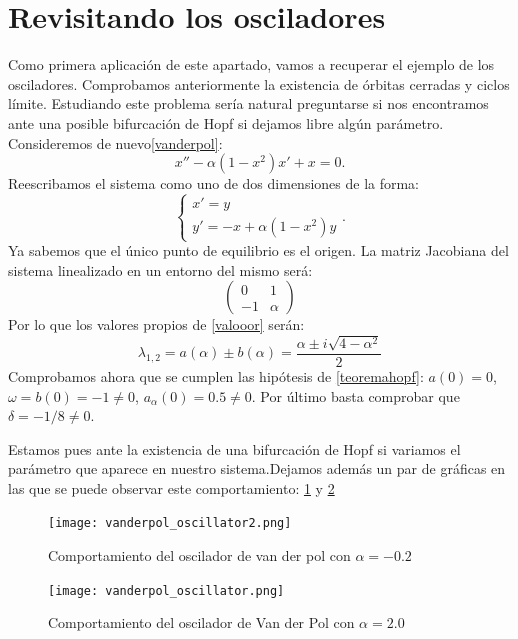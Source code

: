 \section{Revisitando los osciladores}
Como primera aplicación de este apartado, vamos a recuperar el ejemplo de los osciladores. Comprobamos anteriormente la existencia de órbitas cerradas y ciclos límite. Estudiando este problema sería natural preguntarse si nos encontramos ante una posible bifurcación de Hopf si dejamos libre algún parámetro.
Consideremos de nuevo\ref{vanderpol}:
\begin{equation}
x''-\alpha(1-x^2)x'+x=0.
\end{equation}
Reescribamos el sistema como uno de dos dimensiones de la forma:
\begin{equation}
\left \{ \begin{matrix} x'=y\\ y'=-x+\alpha(1-x^2)y\end{matrix}\right . .
\end{equation} 
Ya sabemos que el único punto de equilibrio es el origen. La matriz Jacobiana del sistema linealizado en un entorno del mismo será:
\begin{equation}
\begin{pmatrix}
0&1 \\
-1 & \alpha
\end{pmatrix}
\label{valooor}
\end{equation}
Por lo que los valores propios de \ref{valooor} serán:\[\lambda_{1,2}=a(\alpha)\pm b(\alpha)=\frac{\alpha\pm i\sqrt{4-\alpha^2}}{2} \]
Comprobamos ahora que se cumplen las hipótesis de \ref{teoremahopf}:
$a(0)=0$, $\omega=b(0)=-1\neq 0$, $a_\alpha(0)=0.5\neq0$.
Por último basta comprobar que $\delta=-1/8\neq 0.$

Estamos pues ante la existencia de una bifurcación de Hopf si variamos el parámetro que aparece en nuestro sistema.Dejamos además un par de gráficas en las que se puede observar este comportamiento: \ref{vander1} y \ref{vander2}

 \begin{figure}[H]
 	\centering
 	\texttt{[image: vanderpol\_oscillator2.png]}
 	\caption{Comportamiento del oscilador de van der pol con $\alpha=-0.2$}
 	\label{vander1}
 \end{figure}

 \begin{figure}[H]
 	\centering
 	\texttt{[image: vanderpol\_oscillator.png]}
 	\caption{Comportamiento del oscilador de Van der Pol con $\alpha=2.0$ }
 	\label{vander2}
 \end{figure}


